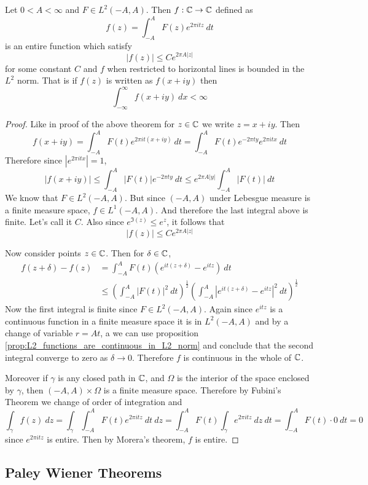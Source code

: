 \begin{proposition}
  Let $0<A<\infty$ and $F \in L^2(-A, A)$. Then $f:\mathbb C \to \mathbb C$ defined as $$f(z) = \int_{-A}^A F(z)e^{2\pi itz} \ dt$$
  is an entire function which satisfy $$|f(z)| \le Ce^{2 \pi A|z|}$$
  for some constant $C$ and $f$ when restricted to horizontal lines is bounded in the $L^2$ norm. That is if $f(z)$ is written as $f(x+iy)$ then  $$\int_{-\infty}^{\infty} f(x+iy) \ dx < \infty$$
\end{proposition}
\begin{proof}
  Like in proof of the above theorem for $z\in \mathbb C$ we write $z = x+iy$. Then $$f(x+iy) = \int_{-A}^A F(t) e^{2\pi it(x+iy)} \ dt = \int_{-A}^A F(t)e^{-2\pi ty}e^{2\pi itx} \ dt$$
  Therefore since $|e^{2\pi it x}| = 1$, $$\left|f(x+iy)\right| \le \int_{-A}^A \left|F(t)\right| e^{-2\pi ty} \ dt \le e^{2\pi A|y|} \int_{-A}^A \left|F(t)\right| \ dt $$
  We know that $F \in L^2(-A, A)$. But since $(-A, A)$ under Lebesgue measure is a finite measure space, $f \in L^1(-A, A)$. And therefore the last integral above is finite. Let's call it $C$. Also since $e^{\Im(z)} \le e^z$, it follows that $$\left|f(z) \right| \le Ce^{2\pi A |z|}$$

  Now consider points $z \in \mathbb C$. Then for $\delta \in \mathbb C$,
  \begin{align*}
    f(z+\delta) - f(z) &= \int_{-A}^A F(t)\left(e^{it(z+\delta)} - e^{itz}\right) \ dt \\
    &\le \left(\int_{-A}^A \left|F(t)\right|^2\ dt \right)^{\frac{1}{2}} \left(\int_{-A}^A \left|e^{it(z+\delta)}-e^{itz}\right|^2 \ dt \right)^{\frac{1}{2}}
  \end{align*}
  Now the first integral is finite since $F\in L^2(-A, A)$. Again since $e^{itz}$ is a continuous function in a finite measure space it is in $L^2(-A, A)$ and by a change of variable $r = At$, a we can use proposition \ref{prop:L2_functions_are_continuous_in_L2_norm} and conclude that the second integral converge to zero as $\delta \to 0$. Therefore $f$ is continuous in the whole of $\mathbb C$. 

  Moreover if $\gamma$ is any closed path in $\mathbb C$, and $\Omega$ is the interior of the space enclosed by $\gamma$, then $(-A, A)\times\Omega$ is a finite measure space. Therefore by Fubini's Theorem we change of order of integration and $$\int_\gamma f(z) \ dz = \int_\gamma \int_{-A}^A F(t)e^{2\pi itz} \ dt \ dz = \int_{-A}^A F(t) \int_\gamma e^{2\pi itz} \ dz \ dt = \int_{-A}^A F(t)\cdot 0 \ dt = 0$$
  since $e^{2\pi itz}$ is entire. Then by Morera's theorem, $f$ is entire.
\end{proof}

\subsection{Paley Wiener Theorems}
\
